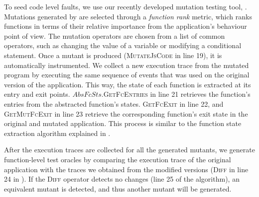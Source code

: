  To seed code level faults, we use our recently developed \javascript mutation testing tool, \mutandis \cite{mirshokraie:icst13}. Mutations generated by \mutandis are selected through a \emph{function rank} metric, which ranks functions in terms of their relative importance from the application's behaviour point of view. 
The mutation operators are chosen from a list of common operators, such as changing the value of a variable or modifying a conditional statement. 
Once a mutant is produced (\textsc{MutateJsCode} in line 19), it is automatically instrumented.
We collect a new execution trace from the mutated  program by executing the same sequence of events that was used on the original version of the application. This way, the state of each \javascript function is extracted at its entry and exit points. $AbsFcSts.$\textsc{GetFcEntries} in line 21 retrieves the function's entries from the abstracted function's states. \textsc{GetFcExit} in line 22, and \textsc{GetMutFcExit} in line 23 retrieve the corresponding function's exit state in the original and mutated application. This process is similar to the function state extraction algorithm explained in .

After the execution traces are collected for all the generated mutants, we generate function-level test oracles by comparing the execution trace of the original application with the traces we obtained from the modified versions (\textsc{Diff} in line 24 in ). 
If the \textsc{Diff} operator detects no changes (line 25 of the algorithm), an equivalent mutant is detected, and thus another mutant will be generated. 

